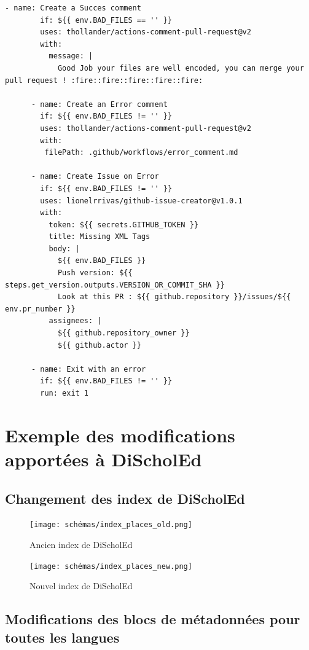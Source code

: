 \begin{lstlisting}[style=YMLStyle, caption=GitHub Action de DiScholEd]
      - name: Create a Succes comment
        if: ${{ env.BAD_FILES == '' }}
        uses: thollander/actions-comment-pull-request@v2
        with:
          message: |
            Good Job your files are well encoded, you can merge your pull request ! :fire::fire::fire::fire::fire:
      
      - name: Create an Error comment
        if: ${{ env.BAD_FILES != '' }}
        uses: thollander/actions-comment-pull-request@v2
        with:
         filePath: .github/workflows/error_comment.md
         
      - name: Create Issue on Error
        if: ${{ env.BAD_FILES != '' }}
        uses: lionelrrivas/github-issue-creator@v1.0.1
        with:
          token: ${{ secrets.GITHUB_TOKEN }}
          title: Missing XML Tags
          body: |
            ${{ env.BAD_FILES }}
            Push version: ${{ steps.get_version.outputs.VERSION_OR_COMMIT_SHA }}
            Look at this PR : ${{ github.repository }}/issues/${{ env.pr_number }}
          assignees: |
            ${{ github.repository_owner }}
            ${{ github.actor }}
            
      - name: Exit with an error
        if: ${{ env.BAD_FILES != '' }}
        run: exit 1

\end{lstlisting}

\newpage

\chapter{Exemple des modifications apportées à DiScholEd}

\newpage

\section{Changement des index de DiScholEd}
\begin{figure}[H]
        \centering
        \texttt{[image: schémas/index\_places\_old.png]}
        \caption{Ancien index de DiScholEd}
        \label{fig:schémas18}
    \end{figure}
\begin{figure}[H]
        \centering
        \texttt{[image: schémas/index\_places\_new.png]}
        \caption{Nouvel index de DiScholEd}
        \label{fig:schémas19}
    \end{figure}

\newpage

\section{Modifications des blocs de métadonnées pour toutes les langues}

